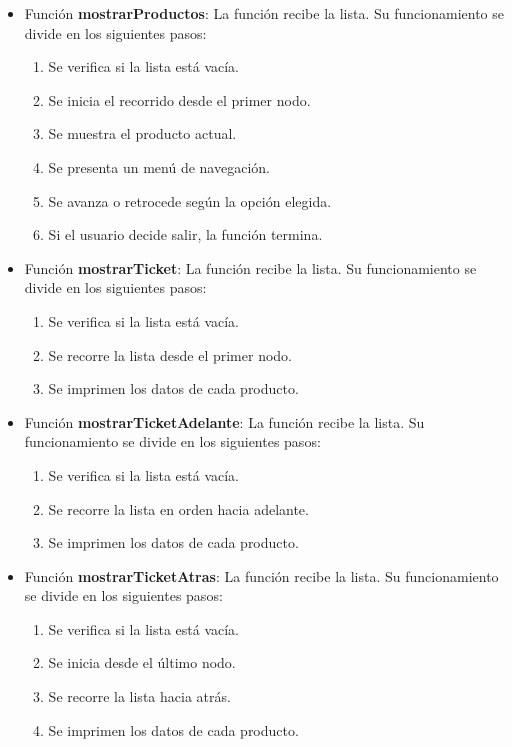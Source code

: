 \documentclass[letterpaper,12pt,oneside]{article}
\begin{document}
\begin{itemize}
\item Función \textbf{mostrarProductos}: La función recibe la lista. Su funcionamiento se divide en los siguientes pasos:
\begin{enumerate}
    \item Se verifica si la lista está vacía.
    \item Se inicia el recorrido desde el primer nodo.
    \item Se muestra el producto actual.
    \item Se presenta un menú de navegación.
    \item Se avanza o retrocede según la opción elegida.
    \item Si el usuario decide salir, la función termina.
\end{enumerate}

\item Función \textbf{mostrarTicket}: La función recibe la lista. Su funcionamiento se divide en los siguientes pasos:
\begin{enumerate}
    \item Se verifica si la lista está vacía.
    \item Se recorre la lista desde el primer nodo.
    \item Se imprimen los datos de cada producto.
\end{enumerate}

\item Función \textbf{mostrarTicketAdelante}: La función recibe la lista. Su funcionamiento se divide en los siguientes pasos:
\begin{enumerate}
    \item Se verifica si la lista está vacía.
    \item Se recorre la lista en orden hacia adelante.
    \item Se imprimen los datos de cada producto.
\end{enumerate}

\item Función \textbf{mostrarTicketAtras}: La función recibe la lista. Su funcionamiento se divide en los siguientes pasos:
\begin{enumerate}
    \item Se verifica si la lista está vacía.
    \item Se inicia desde el último nodo.
    \item Se recorre la lista hacia atrás.
    \item Se imprimen los datos de cada producto.
\end{enumerate}


\end{itemize}
\end{document}
